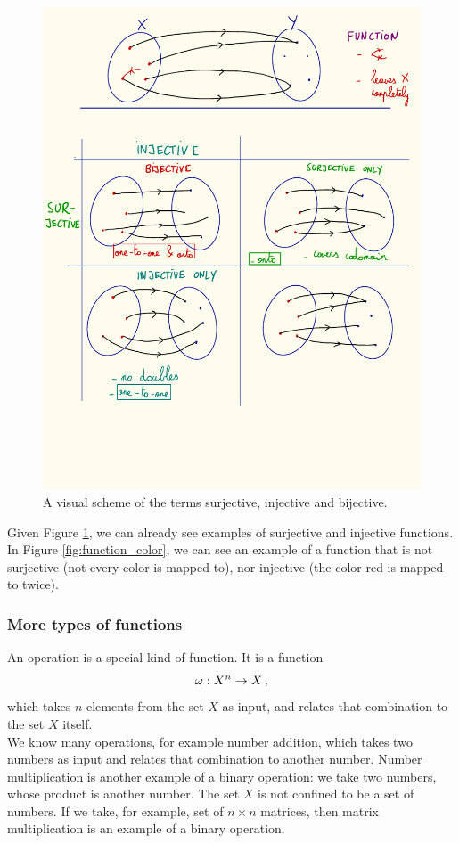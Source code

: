         \begin{figure}[H] \centering
            \includegraphics{images/sur_in_bi}
            \caption{A visual scheme of the terms surjective, injective and bijective.}
            \label{fig:sur_in_bi}
        \end{figure}

        Given Figure \ref{fig:sur_in_bi}, we can already see examples of surjective and injective functions. In Figure \ref{fig:function_color}, we can see an example of a function that is not surjective (not every color is mapped to), nor injective (the color red is mapped to twice). \\

    \subsubsection{More types of functions}
        An operation is a special kind of function. It is a function
        \begin{equation}
            \omega: X^n \rightarrow X \thinspace ,
        \end{equation}
        which takes $n$ elements from the set $X$ as input, and relates that combination to the set $X$ itself. \\

        We know many operations, for example number addition, which takes two numbers as input and relates that combination to another number. Number multiplication is another example of a binary operation: we take two numbers, whose product is another number. The set $X$ is not confined to be a set of numbers. If we take, for example, set of $n \times n$ matrices, then matrix multiplication is an example of a binary operation. \\
